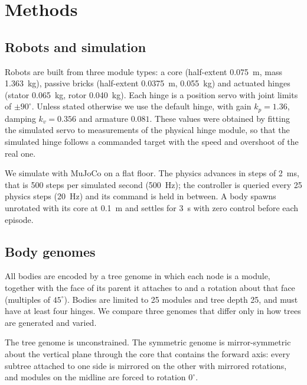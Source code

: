 \section{Methods}
\label{sec:methods}

\subsection{Robots and simulation}
\label{sec:robots}

Robots are built from three module types: a core (half-extent \SI{0.075}{m}, mass \SI{1.363}{kg}), passive bricks (half-extent \SI{0.0375}{m}, \SI{0.055}{kg}) and actuated hinges (stator \SI{0.065}{kg}, rotor \SI{0.040}{kg}). Each hinge is a position servo with joint limits of $\pm 90^\circ$. Unless stated otherwise we use the default hinge, with gain $k_p = 1.36$, damping $k_v = 0.356$ and armature $0.081$. These values were obtained by fitting the simulated servo to measurements of the physical hinge module, so that the simulated hinge follows a commanded target with the speed and overshoot of the real one.

We simulate with MuJoCo on a flat floor. The physics advances in steps of \SI{2}{ms}, that is 500 steps per simulated second (\SI{500}{Hz}); the controller is queried every 25 physics steps (\SI{20}{Hz}) and its command is held in between. A body spawns unrotated with its core at \SI{0.1}{m} and settles for \SI{3}{s} with zero control before each episode.

\subsection{Body genomes}
\label{sec:genomes}

All bodies are encoded by a tree genome in which each node is a module, together with the face of its parent it attaches to and a rotation about that face (multiples of $45^\circ$). Bodies are limited to 25 modules and tree depth 25, and must have at least four hinges. We compare three genomes that differ only in how trees are generated and varied.

The tree genome is unconstrained. The symmetric genome is mirror-symmetric about the vertical plane through the core that contains the forward axis: every subtree attached to one side is mirrored on the other with mirrored rotations, and modules on the midline are forced to rotation $0^\circ$.

